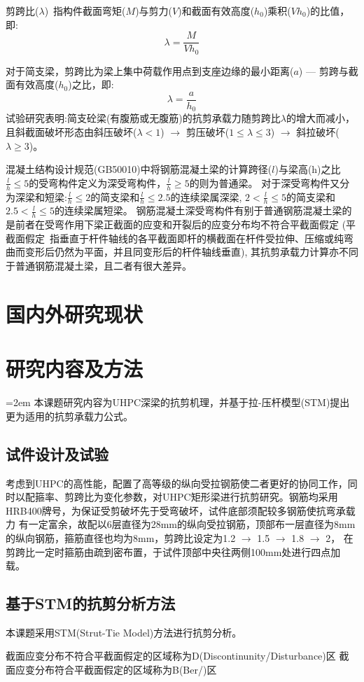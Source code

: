 \documentclass[a4paper,11pt]{article}
\begin{document}
\begin{mybox}
剪跨比($\lambda$)~\cite{叶见曙1997结构设计原理}指构件截面弯矩($M$)与剪力($V$)和截面有效高度($h_0$)乘积($Vh_0$)的比值，即: \[\lambda = \frac{M}{Vh_0}\]

对于简支梁，剪跨比为梁上集中荷载作用点到支座边缘的最小距离($a$) --- 剪跨与截面有效高度($h_0$)之比，即: \[\lambda = \frac{a}{h_0}\]
试验研究表明:简支砼梁(有腹筋或无腹筋)的抗剪承载力随剪跨比$\lambda$的增大而减小，且斜截面破坏形态由斜压破坏($\lambda<1$) $\rightarrow$ 剪压破坏($1 \leqslant \lambda \leqslant 3$) 
$\rightarrow$ 斜拉破坏($\lambda \geqslant 3$)。

混凝土结构设计规范(GB50010)中将钢筋混凝土梁的计算跨径($l$)与梁高(h)之比$ \frac{l}{h} \leqslant 5 $的受弯构件定义为深受弯构件，$ \frac{l}{h} \geqslant 5 $的则为普通梁。
对于深受弯构件又分为深梁和短梁:$ \frac{l}{h} \leqslant 2 $的简支梁和$ \frac{l}{h} \leqslant 2.5 $的连续梁属深梁,
$ 2 < \frac{l}{h} \leqslant 5 $的简支梁和$ 2.5 < \frac{l}{h} \leqslant 5 $的连续梁属短梁。
钢筋混凝土深受弯构件有别于普通钢筋混凝土梁的是前者在受弯作用下梁正截面的应变和开裂后的应变分布均不符合平截面假定
(平截面假定~\cite{刘鸿文2011材}指垂直于杆件轴线的各平截面即杆的横截面在杆件受拉伸、压缩或纯弯曲而变形后仍然为平面，并且同变形后的杆件轴线垂直),
其抗剪承载力计算亦不同于普通钢筋混凝土梁，且二者有很大差异。






\end{mybox}



\section{国内外研究现状}

\section{研究内容及方法}

\begin{mybox}
\parindent=2em 本课题研究内容为UHPC深梁的抗剪机理，并基于拉-压杆模型(STM)提出更为适用的抗剪承载力公式。
\subsection{试件设计及试验}
\indent 考虑到UHPC的高性能，配置了高等级的纵向受拉钢筋使二者更好的协同工作，同时以配箍率、剪跨比为变化参数，对UHPC矩形梁进行抗剪研究。钢筋均采用HRB400牌号，为保证受剪破坏先于受弯破坏，试件底部须配较多钢筋使抗弯承载力
有一定富余，故配以6层直径为28mm的纵向受拉钢筋，顶部布一层直径为8mm的纵向钢筋，箍筋直径也均为8mm，剪跨比设定为1.2 $\rightarrow$ 1.5 $\rightarrow$ 1.8 $\rightarrow$ 2，
在剪跨比一定时箍筋由疏到密布置，于试件顶部中央往两侧100mm处进行四点加载。
\subsection{基于STM的抗剪分析方法}
\indent 本课题采用STM(Strut-Tie Model)方法进行抗剪分析。

截面应变分布不符合平截面假定的区域称为D(Discontinunity/Disturbance)区
截面应变分布符合平截面假定的区域称为B(Ber/)区



\end{mybox}
\end{document}
